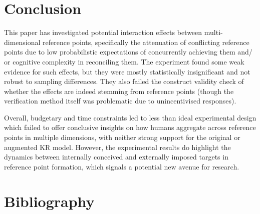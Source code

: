 \documentclass[
  12,
  letterpaper,
  DIV=11,
  numbers=noendperiod]{scrartcl}
\begin{document}
\newpage

\section{Conclusion}\label{conclusion}

This paper has investigated potential interaction effects between
multi-dimensional reference points, specifically the attenuation of
conflicting reference points due to low probabilistic expectations of
concurrently achieving them and/ or cognitive complexity in reconciling
them. The experiment found some weak evidence for such effects, but they
were mostly statistically insignificant and not robust to sampling
differences. They also failed the construct validity check of whether
the effects are indeed stemming from reference points (though the
verification method itself was problematic due to unincentivised
responses).

Overall, budgetary and time constraints led to less than ideal
experimental design which failed to offer conclusive insights on how
humans aggregate across reference points in multiple dimensions, with
neither strong support for the original or augmented KR model. However,
the experimental results do highlight the dynamics between internally
conceived and externally imposed targets in reference point formation,
which signals a potential new avenue for research.

\newpage

\section{Bibliography}\label{bibliography}
\end{document}
